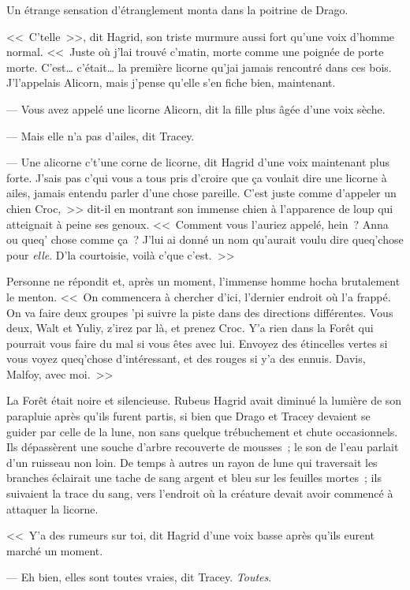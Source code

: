 Un étrange sensation d'étranglement monta dans la poitrine de Drago.

<<~C'telle~>>, dit Hagrid, son triste murmure aussi fort qu'une voix d'homme normal. <<~Juste où j'lai trouvé c'matin, morte comme une poignée de porte morte. C'est… c'était… la première licorne qu'jai jamais rencontré dans ces bois. J'l'appelais Alicorn, mais j'pense qu'elle s'en fiche bien, maintenant.

--- Vous avez appelé une licorne Alicorn, dit la fille plus âgée d'une voix sèche.

--- Mais elle n'a pas d'ailes, dit Tracey.

--- Une alicorne c't'une corne de licorne, dit Hagrid d'une voix maintenant plus forte. J'sais pas c'qui vous a tous pris d'croire que ça voulait dire une licorne à ailes, jamais entendu parler d'une chose pareille. C'est juste comme d'appeler un chien Croc,~>> dit-il en montrant son immense chien à l'apparence de loup qui atteignait à peine ses genoux. <<~Comment vous l'auriez appelé, hein~? Anna ou queq' chose comme ça~? J'lui ai donné un nom qu'aurait voulu dire queq'chose pour \emph{elle}. D'la courtoisie, voilà c'que c'est.~>>

Personne ne répondit et, après un moment, l'immense homme hocha brutalement le menton. <<~On commencera à chercher d'ici, l'dernier endroit où l'a frappé. On va faire deux groupes 'pi suivre la piste dans des directions différentes. Vous deux, Walt et Yuliy, z'irez par là, et prenez Croc. Y'a rien dans la Forêt qui pourrait vous faire du mal si vous êtes avec lui. Envoyez des étincelles vertes si vous voyez queq'chose d'intéressant, et des rouges si y'a des ennuis. Davis, Malfoy, avec moi.~>>

La Forêt était noire et silencieuse. Rubeus Hagrid avait diminué la lumière de son parapluie après qu'ils furent partis, si bien que Drago et Tracey devaient se guider par celle de la lune, non sans quelque trébuchement et chute occasionnels. Ils dépassèrent une souche d'arbre recouverte de mousses~; le son de l'eau parlait d'un ruisseau non loin. De temps à autres un rayon de lune qui traversait les branches éclairait une tache de sang argent et bleu sur les feuilles mortes~; ils suivaient la trace du sang, vers l'endroit où la créature devait avoir commencé à attaquer la licorne.

<<~Y'a des rumeurs sur toi, dit Hagrid d'une voix basse après qu'ils eurent marché un moment.

--- Eh bien, elles sont toutes vraies, dit Tracey. \emph{Toutes}.

